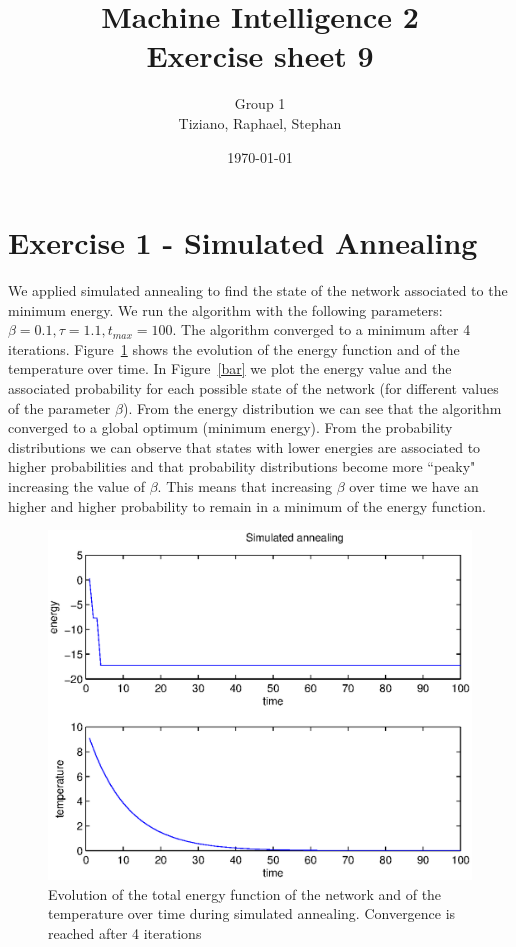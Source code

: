 \documentclass[a4paper,english]{article}
\title{Machine Intelligence 2 \\ Exercise sheet 9}
\author{Group 1 \\Tiziano, Raphael, Stephan}
\date{\today}
\begin{document}
\maketitle


\section*{Exercise 1 - Simulated Annealing}
We applied simulated annealing to find the state of the network associated to the minimum energy. We run the algorithm with the following parameters: $\beta = 0.1,
\tau = 1.1, t_{max} = 100$. The algorithm converged to a minimum after 4 iterations. Figure~\ref{et} shows the evolution of the energy function and of the temperature over time.
In Figure~\ref{bar} we plot the energy value and the associated probability for each possible state of the network (for different values of the parameter $\beta$). From the energy distribution we can see that the algorithm converged to a global optimum (minimum energy). From the probability distributions we can observe that states with lower energies are associated to higher probabilities and that probability distributions become more ``peaky" increasing the value of $\beta$. This means that increasing $\beta$ over time we have an higher and higher probability to remain in a minimum of the energy function. 

\begin{figure}[h!]
\centering
\includegraphics[scale = .7]{ex1_annealing_et.eps}
\caption{Evolution of the total energy function of the network and of the temperature over time during simulated annealing. Convergence is reached after 4 iterations}
\label{et}
\end{figure}
\end{document}
